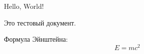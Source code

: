 \documentclass{article}
\begin{document}
Hello, World!

Это тестовый документ.

Формула Эйнштейна:
\[
E = mc^2
\]
\end{document}
